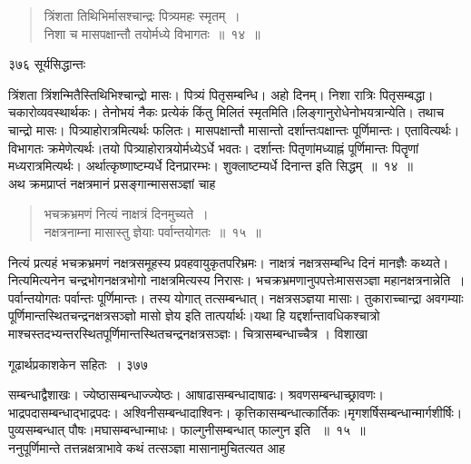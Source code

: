 \documentclass[11pt, openany]{book}
\begin{document}
\begin{quote}
{\ssi त्रिंशता तिथिभिर्मासश्चान्द्रः पित्र्यमहः स्मृतम्~।\\
निशा च मासपक्षान्तौ तयोर्मध्ये विभागतः~॥~१४~॥}
%
\end{quote}



\newpage


\noindent ३७६ \hspace{4cm} सूर्यसिद्धान्तः
\vspace{1cm}


 त्रिंशता त्रिंशन्मितैस्तिथिभिश्चान्द्रो मासः। पित्र्यं पितृसम्बन्धि। अहो दिनम्। निशा रात्रिः पितृसम्बद्धा। चकारोव्यवस्थार्थकः। तेनोभयं नैकः प्रत्येकं किंतु मिलितं स्मृतमिति।लिङ्गानुरोधेनोभयत्रान्येति। तथाच चान्द्रो मासः। पित्र्याहोरात्रमित्यर्थः फलितः। मासपक्षान्तौ मासान्तो दर्शान्तःपक्षान्तः पूर्णिमान्तः। एतावित्यर्थः। विभागतः क्रमेणेत्यर्थः।तयो पित्र्याहोरात्रयोर्मध्येऽर्धे भवतः। दर्शान्तः पितृणांमध्याह्नं पूर्णिमान्तः पितॄणां मध्यरात्रमित्यर्थः। अर्थात्कृष्णाष्टम्यर्धे दिनप्रारम्भः। शुक्लाष्टम्यर्धे दिनान्त इति सिद्धम्~॥~१४~॥\\
 \noindent अथ क्रमप्राप्तं नक्षत्रमानं प्रसङ्गान्माससञ्ज्ञां चाह \textendash


  \begin{quote}
{\ssi भचक्रभ्रमणं नित्यं नाक्षत्रं दिनमुच्यते~।\\
नक्षत्रनाम्ना मासास्तु ज्ञेयाः पर्वान्तयोगतः~॥~१५~॥ }
\end{quote}
 नित्यं प्रत्यहं भचक्रभ्रमणं नक्षत्रसमूहस्य प्रवहवायुकृतपरिभ्रमः। नाक्षत्रं नक्षत्रसम्बन्धि दिनं मानज्ञैः कथ्यते। नित्यमित्यनेन चन्द्रभोगनक्षत्रभोगो नाक्षत्रमित्यस्य निरासः। भचक्रभ्रमणानुपपत्तेः\textendash माससञ्ज्ञा महानक्षत्रनान्नेति~। पर्वान्तयोगतः पर्वान्तः पूर्णिमान्तः। तस्य योगात् तत्सम्बन्धात्। नक्षत्रसञ्ज्ञया मासाः। तुकाराच्चान्द्रा अवगम्याः पूर्णिमान्तस्थितचन्द्रनक्षत्रसञ्ज्ञो मासो ज्ञेय इति तात्पर्यार्थः।यथा हि यद्दर्शान्तावधिकश्चात्रो माश्चस्तदभ्यन्तरस्थितपूर्णिमान्तस्थितचन्द्रनक्षत्रसञ्ज्ञः। चित्रासम्बन्धाच्चैत्र । विशाखा \textendash



\newpage


\hspace{3cm} गूढार्थप्रकाशकेन सहितः~। \hfill ३७७ 
\vspace{1cm}


\noindent सम्बन्धाद्वैशाखः। ज्येष्ठासम्बन्धाज्ज्येष्ठः। आषाढासम्बन्धादाषाढः। श्रवणसम्बन्धाच्छ्रावणः। भाद्रपदासम्बन्धाद्भाद्रपदः। अश्विनीसम्बन्धादाश्विनः। कृत्तिकासम्बन्धात्कार्तिकः।मृगशर्षिसम्बन्धान्मार्गशीर्षिः। पुव्यसम्बन्धात् पौषः।मघासम्बन्धान्माधः। फाल्गुनीसम्बन्धात् फाल्गुन इति ~॥~१५~॥ \\ 
\noindent ननुपूर्णिमान्ते तत्तन्नक्षत्राभावे कथं तत्सञ्ज्ञा मासानामुचितत्यत आह \textendash
\end{document}

